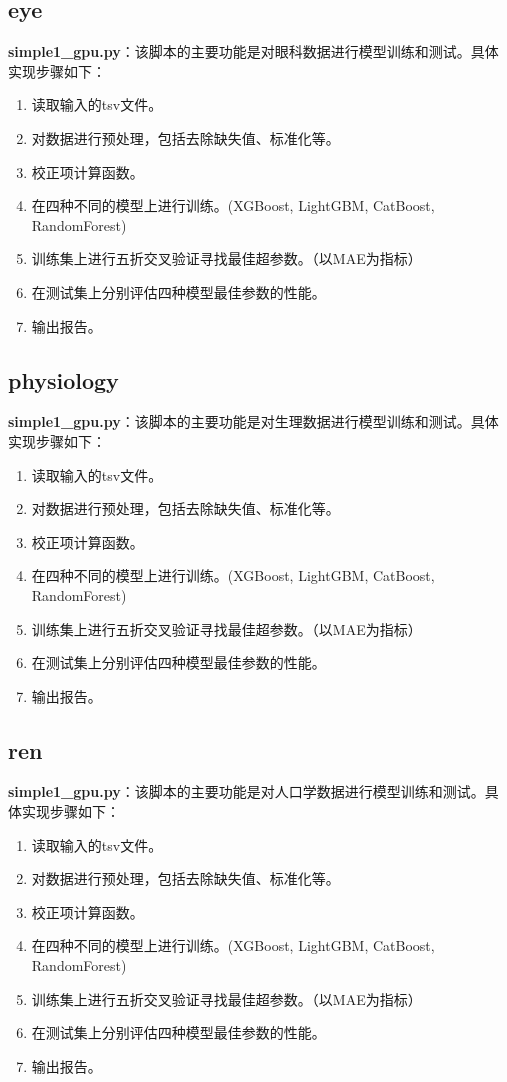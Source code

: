 \documentclass[UTF8]{report}
\theoremstyle{MyLineTheoremStyle} %
\theoremstyle{MyBlockTheoremStyle} %
\theoremstyle{MySubsubsectionStyle} %
\begin{document}
\subsection*{eye}

\textbf{simple1\_gpu.py}：该脚本的主要功能是对眼科数据进行模型训练和测试。具体实现步骤如下：
\begin{enumerate}
    \item 读取输入的tsv文件。
    \item 对数据进行预处理，包括去除缺失值、标准化等。
    \item 校正项计算函数。
    \item 在四种不同的模型上进行训练。(XGBoost, LightGBM, CatBoost, RandomForest)
    \item 训练集上进行五折交叉验证寻找最佳超参数。（以MAE为指标）
    \item 在测试集上分别评估四种模型最佳参数的性能。
    \item 输出报告。
\end{enumerate}

\subsection*{physiology}

\textbf{simple1\_gpu.py}：该脚本的主要功能是对生理数据进行模型训练和测试。具体实现步骤如下：
\begin{enumerate}
    \item 读取输入的tsv文件。
    \item 对数据进行预处理，包括去除缺失值、标准化等。
    \item 校正项计算函数。
    \item 在四种不同的模型上进行训练。(XGBoost, LightGBM, CatBoost, RandomForest)
    \item 训练集上进行五折交叉验证寻找最佳超参数。（以MAE为指标）
    \item 在测试集上分别评估四种模型最佳参数的性能。
    \item 输出报告。
\end{enumerate}

\subsection*{ren}

\textbf{simple1\_gpu.py}：该脚本的主要功能是对人口学数据进行模型训练和测试。具体实现步骤如下：
\begin{enumerate}
    \item 读取输入的tsv文件。
    \item 对数据进行预处理，包括去除缺失值、标准化等。
    \item 校正项计算函数。
    \item 在四种不同的模型上进行训练。(XGBoost, LightGBM, CatBoost, RandomForest)
    \item 训练集上进行五折交叉验证寻找最佳超参数。（以MAE为指标）
    \item 在测试集上分别评估四种模型最佳参数的性能。
    \item 输出报告。
\end{enumerate}
\end{document}
